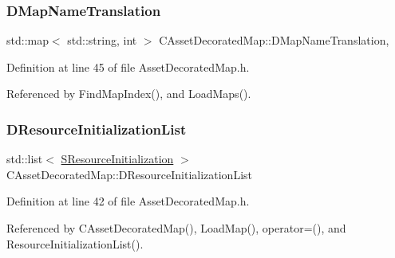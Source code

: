 \hypertarget{classCAssetDecoratedMap_afe82d461911e52b7e088da903166f1b3}{}\label{classCAssetDecoratedMap_afe82d461911e52b7e088da903166f1b3} 
\subsubsection{\texorpdfstring{D\+Map\+Name\+Translation}{DMapNameTranslation}}
{\footnotesize\ttfamily std\+::map$<$ std\+::string, int $>$ C\+Asset\+Decorated\+Map\+::\+D\+Map\+Name\+Translation\hspace{0.3cm}{\ttfamily [static]}, {\ttfamily [protected]}}



Definition at line 45 of file Asset\+Decorated\+Map.\+h.



Referenced by Find\+Map\+Index(), and Load\+Maps().

\hypertarget{classCAssetDecoratedMap_ab4c78aeb90280ea98a3aa542cdb7f8cc}{}\label{classCAssetDecoratedMap_ab4c78aeb90280ea98a3aa542cdb7f8cc} 
\subsubsection{\texorpdfstring{D\+Resource\+Initialization\+List}{DResourceInitializationList}}
{\footnotesize\ttfamily std\+::list$<$ \hyperlink{structCAssetDecoratedMap_1_1SResourceInitialization}{S\+Resource\+Initialization} $>$ C\+Asset\+Decorated\+Map\+::\+D\+Resource\+Initialization\+List\hspace{0.3cm}{\ttfamily [protected]}}



Definition at line 42 of file Asset\+Decorated\+Map.\+h.



Referenced by C\+Asset\+Decorated\+Map(), Load\+Map(), operator=(), and Resource\+Initialization\+List().

\hypertarget{classCAssetDecoratedMap_a7e6c8b62a9f83cec4bc77dc833d5787a}{}\label{classCAssetDecoratedMap_a7e6c8b62a9f83cec4bc77dc833d5787a} 

